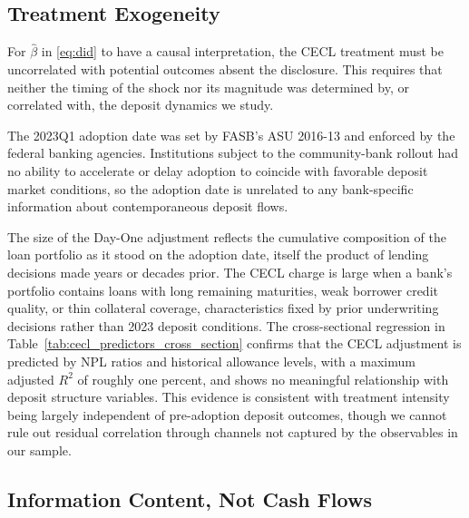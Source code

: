 \subsection{Treatment Exogeneity}
\label{sec:identification:predetermination}

For $\hat{\beta}$ in \eqref{eq:did} to have a causal interpretation,
the CECL treatment must be uncorrelated with potential outcomes absent the
disclosure.  This requires that neither the timing of the shock nor its
magnitude was determined by, or correlated with, the deposit dynamics we
study.

The 2023Q1 adoption date was set by FASB's ASU 2016-13 and enforced by the
federal banking agencies.  Institutions subject to the community-bank rollout
had no ability to accelerate or delay adoption to coincide with favorable
deposit market conditions, so the adoption date is unrelated to any
bank-specific information about contemporaneous deposit flows.

The size of the Day-One adjustment reflects the cumulative composition of the
loan portfolio as it stood on the adoption date, itself the product of
lending decisions made years or decades prior.  The CECL charge is large when
a bank's portfolio contains loans with long remaining maturities, weak
borrower credit quality, or thin collateral coverage, characteristics fixed
by prior underwriting decisions rather than 2023 deposit conditions.  The
cross-sectional regression in Table~\ref{tab:cecl_predictors_cross_section}
confirms that the CECL adjustment is predicted by NPL ratios and historical
allowance levels, with a maximum adjusted $R^2$ of roughly one percent,
and shows no meaningful relationship with deposit structure variables.
This evidence is consistent with treatment intensity being largely independent
of pre-adoption deposit outcomes, though we cannot rule out residual
correlation through channels not captured by the observables in our sample.


\subsection{Information Content, Not Cash Flows}
\label{sec:identification:mechanism}

